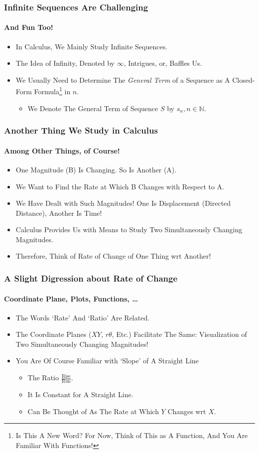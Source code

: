 \documentclass{beamer}
\begin{document}
\begin{frame}
\frametitle{Infinite Sequences Are Challenging}
\framesubtitle{And Fun Too!}
\label{slide:infseq}
\begin{itemize}
\pause
\item In Calculus, We Mainly Study Infinite Sequences.
\pause
\item The Idea of Infinity, Denoted by $\infty$, Intrigues, or, Baffles Us.
\pause
\item We Usually Need to Determine The \textit{General Term} of a Sequence as \alert{A Closed-Form Formula\footnote{Is This A New Word? For Now, Think of This as A Function, And You Are Familiar With Functions!} in $n$}.
\begin{itemize}
\item We Denote The General Term of Sequence $S$ by $s_n, n\in\mathbb{N}$.
\end{itemize}
\end{itemize}
\end{frame}

\begin{frame}
\frametitle{Another Thing We Study in Calculus}
\framesubtitle{Among Other Things, of Course!}
\label{slide:rateofchange}
\begin{itemize}
\pause
\item One Magnitude (B) Is Changing. So Is Another (A).
\pause
\item We Want to Find the \alert{Rate} at Which B Changes \alert{with Respect to} A.
\pause
\item We Have Dealt with Such Magnitudes! One Is Displacement (Directed Distance), Another Is Time!
\pause
\item Calculus Provides Us with Means to Study Two Simultaneously Changing Magnitudes.
\pause
\item Therefore, Think of \alert{Rate} of Change of One Thing \alert{wrt} Another!
\end{itemize}
\end{frame}

\begin{frame}
\frametitle{A Slight Digression about \alert{Rate of Change}}
\framesubtitle{Coordinate Plane, Plots, Functions, \dots}
\label{slide:rateofchange2}
\begin{itemize}
\pause \item The Words `Rate' And `Ratio' Are Related.
\pause \item The Coordinate Planes ($XY$, $r\theta$, Etc.) Facilitate The Same: Visualization of Two Simultaneously Changing Magnitudes!
\pause \item You Are Of Course Familiar with `Slope' of A Straight Line
\begin{itemize}
\pause \item The Ratio $\frac{\text{Rise}}{\text{Run}}$.
\pause \item It Is Constant for A Straight Line.
\pause \item Can Be Thought of As \alert{The Rate at Which $Y$ Changes wrt $X$}.
\end{itemize}
\end{itemize}
\end{frame}
\end{document}

